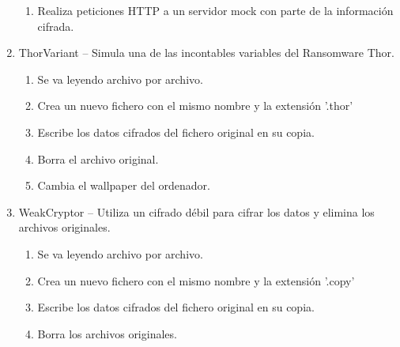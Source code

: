\documentclass[a4paper,12pt]{article}
\begin{document}
\begin{enumerate}
\begin{enumerate}
	\item Realiza peticiones HTTP a un servidor mock con parte de la información cifrada.
\end{enumerate}
\item ThorVariant – Simula una de las incontables variables del Ransomware Thor.
\begin{enumerate}
	\item Se va leyendo archivo por archivo.
	\item Crea un nuevo fichero con el mismo nombre y la extensión '.thor'
	\item Escribe los datos cifrados del fichero original en su copia.
	\item Borra el archivo original.
	\item Cambia el wallpaper del ordenador.
\end{enumerate}
\item WeakCryptor – Utiliza un cifrado débil para cifrar los datos y elimina los archivos originales.
\begin{enumerate}
	\item Se va leyendo archivo por archivo.
	\item Crea un nuevo fichero con el mismo nombre y la extensión '.copy'
	\item Escribe los datos cifrados del fichero original en su copia.
	\item Borra los archivos originales.
\end{enumerate}
\end{enumerate} 
\end{document}
